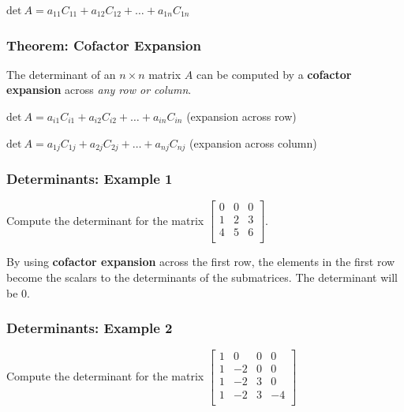 \documentclass[12pt, letterpaper]{article}
\begin{document}
\medskip
{\centering

  $ \textrm{det} \: A = a_{11} C_{11} + a_{12}C_{12} + \hdots + a_{1n}C_{1n} $

}
\medskip

\subsubsection*{Theorem: Cofactor Expansion}

The determinant of an $ n \times n $ matrix $ A $ can be computed by
a \textbf{cofactor expansion} across \textit{any row or column}.

\medskip
{\centering

  $ \textrm{det} \: A = a_{i1}C_{i1} + a_{i2}C_{i2} + \hdots +
  a_{in}C_{in} $ (expansion across row)
  \medskip

  $ \textrm{det} \: A = a_{1j}C_{1j} + a_{2j}C_{2j} + \hdots +
  a_{nj}C_{nj} $ (expansion across column)

}
\medskip

\subsubsection*{Determinants: Example 1}

Compute the determinant for the matrix $
\begin{bmatrix}
  0 & 0 & 0 \\
  1 & 2 & 3 \\
  4 & 5 & 6 \\
\end{bmatrix} $.
\bigskip

By using \textbf{cofactor expansion} across the first row, the
elements in the first row become the scalars to the determinants of
the submatrices. The determinant will be 0.

\subsubsection*{Determinants: Example 2}

Compute the determinant for the matrix $
\begin{bmatrix}
  1 & 0 & 0 & 0 \\
  1 & -2 & 0 & 0 \\
  1 & -2 & 3 & 0 \\
  1 & -2 & 3 & -4 \\
\end{bmatrix} $
\bigskip
\end{document}
